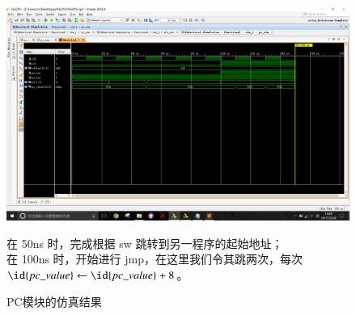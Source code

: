 \documentclass[titlepage, 11pt]{article}
\begin{document}
		\begin{figure}[H]  
				\centering
				\includegraphics[scale=0.4]{pc.png}  
				\caption{PC模块的仿真结果}
				在 50ns 时，完成根据 sw 跳转到另一程序的起始地址；\\
				在 100ns 时，开始进行 jmp，在这里我们令其跳两次，每次 $\id{pc\_value}\gets\id{pc\_value}+8$。
		\end{figure}
\end{document}
